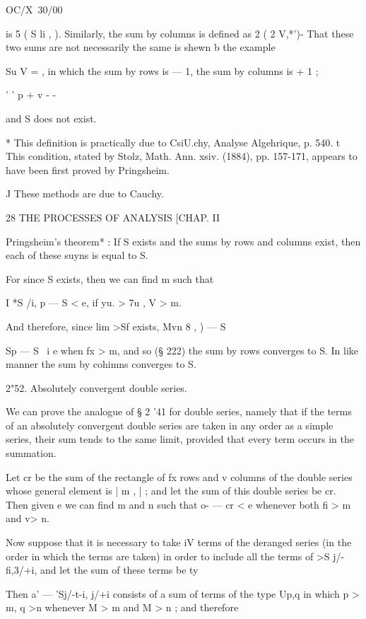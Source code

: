 OC/X\ 30/00\ 

is 5  ( S li ,  ). Similarly, the sum by columns is defined as 2 ( 2  V,*')- 
That these two sums are not necessarily the same is shewn b   the example 

Su V = , in which the sum by rows is — 1, the sum by columns is + 1 ; 

' ' p + v -    -  

and S does not exist. 

* This definition is practically due to CsiU.chy, Analyse Algehrique, p. 540. 
t This condition, stated by Stolz, Math. Ann. xsiv. (1884), pp. 157-171, appears to have 
been first proved by Pringsheim. 

J These methods are due to Cauchy. 



28 THE PROCESSES OF ANALYSIS [CHAP. II 

Pringsheim's theorem* : If S exists and the sums by rows and columns 
exist, then each of these suyns is equal to S. 

For since S exists, then we can find m such that 

I *S /i, p — S < e, if yu. > 7u , V > m. 

And therefore, since lim >Sf    exists,  Mvn 8 , ) — S %

  Sp — S \ i e when fx > m, and so (§ 222) the sum by rows converges to S. 
In like manner the sum by cohimns converges to S. 

2"52. Absolutely convergent double series. 

We can prove the analogue of § 2 '41 for double series, namely that if the 
terms of an absolutely convergent double series are taken in any order as a 
simple series, their sum tends to the same limit, provided that every term occurs 
in the summation. 

Let cr    be the sum of the rectangle of fx rows and v columns of the 
double series whose general element is | m ,  | ; and let the sum of this double 
series be cr. Then given e we can find m and n such that o- — cr    < e 
whenever both fi > m and v> n. 

Now suppose that it is necessary to take iV terms of the deranged series 
(in  the order in which the terms are taken) in order to include all the terms 
of >S j/-fi,3/+i, and let the sum of these terms be ty 

Then  a' — 'Sj/-t-i, j/+i consists of a sum of terms of the type Up,q in which 
p > m, q >n whenever M > m and M > n ; and therefore 

